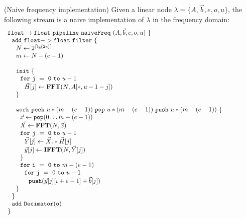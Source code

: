 \begin{transformation} (Naive frequency implementation)
Given a linear node $\lambda = \{A, {\vec b}, e, o, u\}$, the
following stream is a naive implementation of $\lambda$ in the
frequency domain: \\
\begin{equation} \nonumber
  \begin{array}{ll}

    {\tt float \rightarrow float}~{\tt pipeline~naiveFreq~}(A, {\vec b}, e, o, u){\tt ~\{} & \hspace{40pt}\\
    ~~{\tt add~float->float~filter~\{}\\
    ~~~~N \leftarrow 2^{\lceil \lg(2e) \rceil} \\
    ~~~~m \leftarrow N-(e-1) \\
    \\
    ~~~~{\tt init}~{\tt \{} \\
    ~~~~~~{\tt for~j~=~0~to~}u-1\\
    ~~~~~~~~\vec{H}[j] \leftarrow \mathbf{FFT}(N,A[*,u-1-j]) \\
    ~~~~{\tt \}} \\
    \\
    ~~~~{\tt work}~{\tt peek}~u*(m-(e-1))~{\tt pop}~u*(m-(e-1))~{\tt push}~u*(m-(e-1))~{\tt \{} \\
    ~~~~~~\vec{x} \leftarrow {\tt pop}(0 \dots m - (e-1)) \\
    ~~~~~~\vec{X} \leftarrow \mathbf{FFT} (N, \vec{x}) \\
    ~~~~~~{\tt for~j~=~0~to~}u-1\\
    ~~~~~~~~\vec{Y}[j] \leftarrow \vec{X} .* \vec{H}[j] \\
    ~~~~~~~~\vec{y}[j] \leftarrow \mathbf{IFFT}(N, \vec{Y}[j]) \\
    ~~~~~~{\tt \}} \\
    ~~~~~~{\tt for~i~=~0~to~}m-(e-1)\\
    ~~~~~~~~{\tt for~j~=~0~to~}u-1\\
    ~~~~~~~~~~{\tt push}(\vec{y}[j][i+e-1] + {\vec b}[j])\\
    ~~~~{\tt \}} \\
    ~~{\tt \}} \\
    ~~{\tt add~Decimator(o)} \\
    {\tt \}} \\
  \end{array}
\end{equation}
\label{trans:freq1}
\end{transformation}

